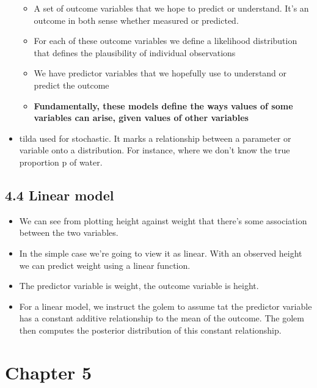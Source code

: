 \documentclass[11pt]{article}
\begin{document}
\begin{itemize}
  \begin{itemize}
  \tightlist
  \item
    A set of outcome variables that we hope to predict or understand.
    It's an outcome in both sense whether measured or predicted.
  \item
    For each of these outcome variables we define a likelihood
    distribution that defines the plausibility of individual
    observations
  \item
    We have predictor variables that we hopefully use to understand or
    predict the outcome
  \item
    \textbf{Fundamentally, these models define the ways values of some
    variables can arise, given values of other variables}
  \end{itemize}
\item
  tilda used for stochastic. It marks a relationship between a parameter
  or variable onto a distribution. For instance, where we don't know the
  true proportion p of water.
\end{itemize}

\hypertarget{linear-model}{%
\subsection{4.4 Linear model}\label{linear-model}}

\begin{itemize}
\tightlist
\item
  We can see from plotting height against weight that there's some
  association between the two variables.
\item
  In the simple case we're going to view it as linear. With an observed
  height we can predict weight using a linear function.
\item
  The predictor variable is weight, the outcome variable is height.
\item
  For a linear model, we instruct the golem to assume tat the predictor
  variable has a constant additive relationship to the mean of the
  outcome. The golem then computes the posterior distribution of this
  constant relationship.
\end{itemize}

\hypertarget{chapter-5}{%
\section{Chapter 5}\label{chapter-5}}
\end{document}
